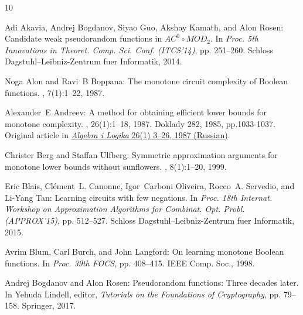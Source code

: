 \documentclass[11pt]{article}
\numberwithin{equation}{section}
\theoremstyle{definition}
\theoremstyle{plain}
\begin{document}
\tocrefpdfbookmark
\begin{thebibliography}{10}

{\sc Adi Akavia, Andrej Bogdanov, Siyao Guo, Akshay Kamath, and Alon Rosen}:
  Candidate weak pseudorandom functions in {$AC^0\circ MOD_2$}.
\newblock In {\em Proc. 5th Innovations in Theoret. Comp. Sci. Conf.
  (ITCS'14)}, pp. 251--260. Schloss Dagstuhl--Leibniz-Zentrum fuer Informatik,
  2014.
\newblock [\epfmtdoi{10.1145/2554797.2554821}]

{\sc Noga Alon and Ravi~B Boppana}: The monotone circuit complexity of
  {B}oolean functions.
, 7(1):1--22, 1987.
\newblock [\epfmtdoi{10.1007/BF02579196}]

{\sc Alexander~E Andreev}: A method for obtaining efficient lower bounds for
  monotone complexity.
, 26(1):1--18, 1987.
\newblock \prelim Doklady 282, 1985, pp.1033-1037. Original article in
  \href{https://www.mathnet.ru/php/archive.phtml?wshow=paper&jrnid=al&paperid=1967}{\emph{Algebra
  i Logika} 26(1) 3--26, 1987 (Russian)}.
\newblock [\epfmtdoi{10.1007/BF01978380}]

{\sc Christer Berg and Staffan Ulfberg}: Symmetric approximation arguments for
  monotone lower bounds without sunflowers.
, 8(1):1--20, 1999.
\newblock [\epfmtdoi{10.1007/s000370050017}]

{\sc Eric Blais, Cl{\'{e}}ment~L. Canonne, Igor~Carboni Oliveira, Rocco~A.
  Servedio, and Li{-}Yang Tan}: Learning circuits with few negations.
\newblock In {\em Proc. 18th Internat. Workshop on Approximation Algorithms for
  Combinat. Opt. Probl. (APPROX'15)}, pp. 512--527. Schloss
  Dagstuhl--Leibniz-Zentrum fuer Informatik, 2015.

{\sc Avrim Blum, Carl Burch, and John Langford}: On learning monotone {B}oolean
  functions.
\newblock In {\em Proc. 39th FOCS}, pp. 408--415. IEEE Comp. Soc., 1998.

{\sc Andrej Bogdanov and Alon Rosen}: Pseudorandom functions: Three decades
  later.
\newblock In {\sc Yehuda Lindell}, editor, {\em Tutorials on the Foundations of
  Cryptography}, pp. 79--158. Springer, 2017.
\newblock [\epfmtdoi{10.1007/978-3-319-57048-8\_3}]


\end{thebibliography}
\end{document}
